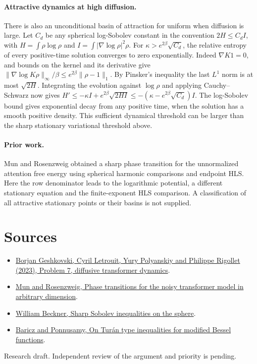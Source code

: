 \documentclass[10pt]{article}
\begin{document}
\paragraph{Attractive dynamics at high diffusion.} There is also an unconditional basin of attraction for uniform when diffusion is large. Let $C_d$ be any spherical log-Sobolev constant in the convention $2H\le C_d I$, with $H=\int \rho\log\rho$ and $I=\int|\nabla\log\rho|^2\rho$. For $\kappa>e^{2\beta}\sqrt{C_d}$, the relative entropy of every positive-time solution converges to zero exponentially. Indeed $\nabla K1=0$, and bounds on the kernel and its derivative give
$\|\nabla\log K\rho\|_\infty/\beta\le e^{2\beta}\|\rho-1\|_1$. By Pinsker's inequality the last $L^1$ norm is at most $\sqrt{2H}$. Integrating the evolution against $\log\rho$ and applying Cauchy--Schwarz now gives
$H'\le-\kappa I+e^{2\beta}\sqrt{2H I}\le-(\kappa-e^{2\beta}\sqrt{C_d})I$.
The log-Sobolev bound gives exponential decay from any positive time, when the solution has a smooth positive density. This sufficient dynamical threshold can be larger than the sharp stationary variational threshold above.

\paragraph{Prior work.} Mun and Rosenzweig obtained a sharp phase transition for the unnormalized attention free energy using spherical harmonic comparisons and endpoint HLS. Here the row denominator leads to the logarithmic potential, a different stationary equation and the finite-exponent HLS comparison. A classification of all attractive stationary points or their basins is not supplied.

\section*{Sources}
\begin{itemize}
\item \href{https://arxiv.org/abs/2312.10794}{Borjan Geshkovski, Cyril Letrouit, Yury Polyanskiy and Philippe Rigollet (2023), Problem 7, diffusive transformer dynamics}.
\item \href{https://arxiv.org/abs/2606.05140}{Mun and Rosenzweig, Phase transitions for the noisy transformer model in arbitrary dimension}.
\item \href{https://annals.math.princeton.edu/1993/138-1/p05}{William Beckner, Sharp Sobolev inequalities on the sphere}.
\item \href{https://arxiv.org/abs/1010.3346}{Baricz and Ponnusamy, On Turán type inequalities for modified Bessel functions}.
\end{itemize}
{\small Research draft. Independent review of the argument and priority is pending.}
\end{document}
